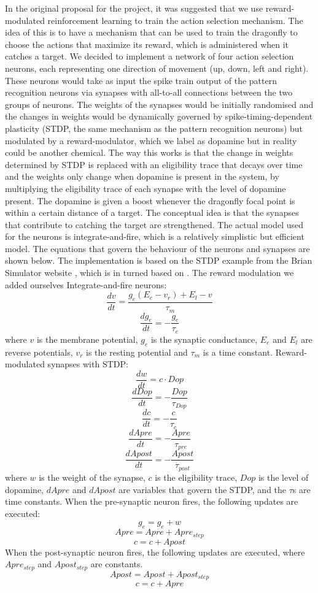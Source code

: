 \documentclass[a4paper,11pt]{article}
\begin{document}
In the original proposal for the project, it was suggested that we use reward-modulated reinforcement learning to train the action selection mechanism. The idea of this is to have a mechanism that can be used to train the dragonfly to choose the actions that maximize its reward, which is administered when it catches a target. 
\newline
\newline
	We decided to implement a network of four action selection neurons, each representing one direction of movement (up, down, left and right). These neurons would take as input the spike train output of the pattern recognition neurons via synapses with all-to-all connections between the two groups of neurons. The weights of the synapses would be initially randomised and the changes in weights would be dynamically governed by spike-timing-dependent plasticity (STDP, the same mechanism as the pattern recognition neurons) but modulated by a reward-modulator, which we label as dopamine but in reality could be another chemical. The way this works is that the change in weights determined by STDP is replaced with an eligibility trace that decays over time and the weights only change when dopamine is present in the system, by multiplying the eligibility trace of each synapse with the level of dopamine present. The dopamine is given a boost whenever the dragonfly focal point is within a certain distance of a target. The conceptual idea is that the synapses that contribute to catching the target are strengthened. The actual model used for the neurons is integrate-and-fire, which is a relatively simplistic but efficient model. The equations that govern the behaviour of the neurons and synapses are shown below. The implementation is based on the STDP example from the Brian Simulator website \cite{brian}, which is in turned based on \cite{Song2000}. The reward modulation we added ourselves
\newline
\newline
Integrate-and-fire neurons:
$$\frac{dv}{dt}=\frac{g _{e} (E_{e}-v _{r}) + E_{l} -v}{ \tau_{m}}$$
$$\frac{dg_{e}}{dt}= -\frac{g_{e}}{\tau_{e}}$$
where $v$ is the membrane potential, $g_{e}$ is the synaptic conductance, $E_{e}$ and $E_{l}$ are reverse potentials, $v_{r}$ is the resting potential and $\tau _{m}$ is a time constant.
\newline
\newline
Reward-modulated synapses with STDP:
$$\frac{dw}{dt} = c \cdot Dop$$
$$\frac{dDop}{dt}=-\frac{Dop}{\tau _{Dop}}$$
$$\frac{dc}{dt} = -\frac{c}{\tau _{c}}$$
$$\frac{dApre}{dt}=-\frac{Apre}{\tau_{pre}}$$
$$\frac{dApost}{dt}=-\frac{Apost}{\tau_{post}}$$
where $w$ is the weight of the synapse, $c$ is the eligibility trace, $Dop$ is the level of dopamine, $dApre$ and $dApost$ are variables that govern the STDP, and the $\tau$s are time constants.
When the pre-synaptic neuron fires, the following updates are executed:
$$g_{e} = g_{e} + w$$
$$Apre = Apre + Apre _{step}$$
$$c =c+Apost$$
When the post-synaptic neuron fires, the following updates are executed, where $Apre_{step}$ and $Apost_{step}$ are constants.
$$Apost = Apost + Apost _{step}$$
$$c =c+Apre$$
\end{document}
